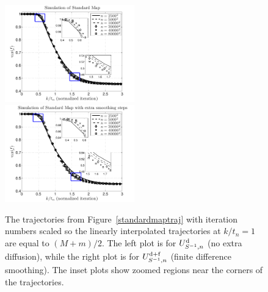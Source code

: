\documentclass{aims}
\theoremstyle{definition}
\begin{document}
\begin{figure}
    \centerline{
      \includegraphics[width=0.5\textwidth,trim=0 0 0 22,clip=true]{standardmapcutoffn}
      \includegraphics[width=0.5\textwidth,trim=0 0 0 22,clip=true]{standardmapcutoffwithsmoothingn}
    }
    \caption{\label{standardmaptrajnorm} The trajectories from
      Figure~\ref{standardmaptraj} with iteration numbers scaled so
      the linearly interpolated trajectories at $k / t_n = 1$ are
      equal to $(M+m)/2$. The left plot is for $U_{S^{-1},n}^{\rm d}$ (no extra
      diffusion), while the right plot is for $U_{S^{-1},n}^{\rm d+f}$ (finite
      difference smoothing). The inset plots show zoomed regions near
      the corners of the trajectories.}
\end{figure}
\end{document}
